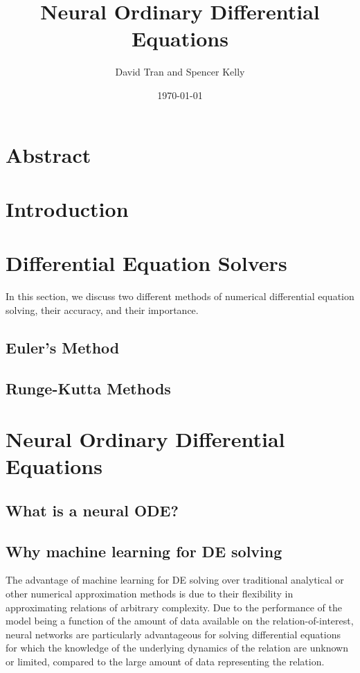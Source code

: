 \documentclass[11pt]{article}
\title{Neural Ordinary Differential Equations}
\author{David Tran and Spencer Kelly}
\date{\today}
\begin{document}
\maketitle

\section*{Abstract}

\section{Introduction}

\section{Differential Equation Solvers}

In this section, we discuss two different methods of numerical differential equation solving, their accuracy, and their importance.

\subsection{Euler's Method}

\subsection{Runge-Kutta Methods}

\section{Neural Ordinary Differential Equations}

\subsection{What is a neural ODE?}

\subsection{Why machine learning for DE solving}

The advantage of machine learning for DE solving over traditional analytical or other numerical approximation methods is due to their flexibility in approximating relations of arbitrary complexity. Due to the performance of the model being a function of the amount of data available on the relation-of-interest, neural networks are particularly advantageous for solving differential equations for which the knowledge of the underlying dynamics of the relation are unknown or limited, compared to the large amount of data representing the relation.
\end{document}
